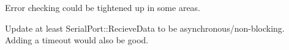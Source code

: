 
\begin{DoxyRefList}
\item[\label{todo__todo000001}%
\hypertarget{todo__todo000001}{}%
File \hyperlink{dealerIO_8h}{dealer\-I\-O.h} ]Error checking could be tightened up in some areas.  
\item[\label{todo__todo000002}%
\hypertarget{todo__todo000002}{}%
File \hyperlink{SerialPort_8h}{Serial\-Port.h} ]Update at least Serial\-Port\-::\-Recieve\-Data to be asynchronous/non-\/blocking. Adding a timeout would also be good. 
\end{DoxyRefList}